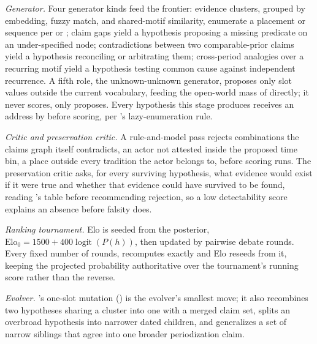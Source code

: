 \documentclass[11pt]{article}
\begin{document}
\emph{Generator.} Four generator kinds feed the frontier: evidence
clusters, grouped by embedding, fuzzy match, and shared-motif similarity,
enumerate a placement or sequence per  or
; claim gaps yield a hypothesis proposing a
missing predicate on an under-specified node; contradictions between two
comparable-prior claims yield a hypothesis reconciling or arbitrating
them; cross-period analogies over a recurring motif yield a hypothesis
testing common cause against independent recurrence. A fifth role, the
unknown-unknown generator, proposes only slot values outside the current
vocabulary, feeding the open-world mass of 
directly; it never scores, only proposes. Every hypothesis this stage
produces receives an address by  before scoring, per
's lazy-enumeration rule.

\emph{Critic and preservation critic.} A rule-and-model pass rejects
combinations the claims graph itself contradicts, an actor not attested
inside the proposed time bin, a place outside every tradition the actor
belongs to, before scoring runs. The preservation critic asks, for every
surviving hypothesis, what evidence would exist if it were true and
whether that evidence could have survived to be found, reading
's table before recommending rejection, so a low
detectability score explains an absence before falsity does.

\emph{Ranking tournament.} Elo is seeded from the posterior,
$\mathrm{Elo}_0 = 1500 + 400 \operatorname{logit}(P(h))$, then updated by
pairwise debate rounds. Every fixed number of rounds, 
recomputes exactly and Elo reseeds from it, keeping the projected
probability authoritative over the tournament's running score rather than
the reverse.

\emph{Evolver.} 's one-slot mutation
() is the evolver's smallest move; it also recombines
two hypotheses sharing a cluster into
one with a merged claim set, splits an overbroad hypothesis into narrower
dated children, and generalizes a set of narrow siblings that agree into
one broader periodization claim.
\end{document}
